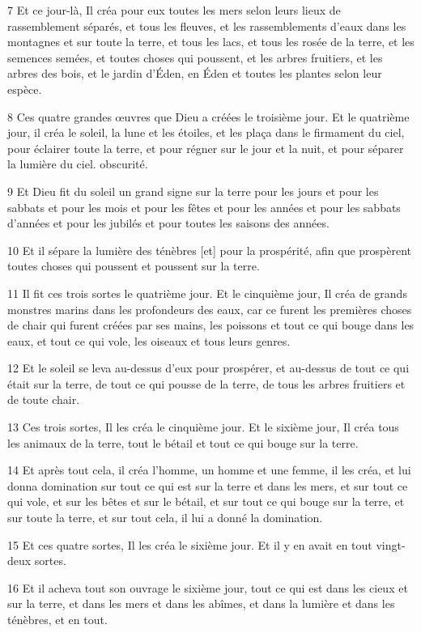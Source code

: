 \par 7 Et ce jour-là, Il créa pour eux toutes les mers selon leurs lieux de rassemblement séparés, et tous les fleuves, et les rassemblements d'eaux dans les montagnes et sur toute la terre, et tous les lacs, et tous les rosée de la terre, et les semences semées, et toutes choses qui poussent, et les arbres fruitiers, et les arbres des bois, et le jardin d'Éden, en Éden et toutes les plantes selon leur espèce.
\par 8 Ces quatre grandes œuvres que Dieu a créées le troisième jour. Et le quatrième jour, il créa le soleil, la lune et les étoiles, et les plaça dans le firmament du ciel, pour éclairer toute la terre, et pour régner sur le jour et la nuit, et pour séparer la lumière du ciel. obscurité.
\par 9 Et Dieu fit du soleil un grand signe sur la terre pour les jours et pour les sabbats et pour les mois et pour les fêtes et pour les années et pour les sabbats d'années et pour les jubilés et pour toutes les saisons des années.
\par 10 Et il sépare la lumière des ténèbres [et] pour la prospérité, afin que prospèrent toutes choses qui poussent et poussent sur la terre.
\par 11 Il fit ces trois sortes le quatrième jour. Et le cinquième jour, Il créa de grands monstres marins dans les profondeurs des eaux, car ce furent les premières choses de chair qui furent créées par ses mains, les poissons et tout ce qui bouge dans les eaux, et tout ce qui vole, les oiseaux et tous leurs genres.
\par 12 Et le soleil se leva au-dessus d'eux pour prospérer, et au-dessus de tout ce qui était sur la terre, de tout ce qui pousse de la terre, de tous les arbres fruitiers et de toute chair.
\par 13 Ces trois sortes, Il les créa le cinquième jour. Et le sixième jour, Il créa tous les animaux de la terre, tout le bétail et tout ce qui bouge sur la terre.
\par 14 Et après tout cela, il créa l'homme, un homme et une femme, il les créa, et lui donna domination sur tout ce qui est sur la terre et dans les mers, et sur tout ce qui vole, et sur les bêtes et sur le bétail, et sur tout ce qui bouge sur la terre, et sur toute la terre, et sur tout cela, il lui a donné la domination.
\par 15 Et ces quatre sortes, Il les créa le sixième jour. Et il y en avait en tout vingt-deux sortes.
\par 16 Et il acheva tout son ouvrage le sixième jour, tout ce qui est dans les cieux et sur la terre, et dans les mers et dans les abîmes, et dans la lumière et dans les ténèbres, et en tout.
